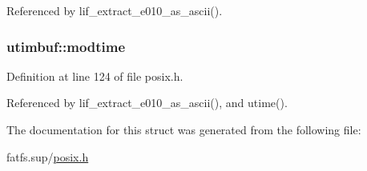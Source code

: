 Referenced by lif\+\_\+extract\+\_\+e010\+\_\+as\+\_\+ascii().

\subsubsection[{\texorpdfstring{modtime}{modtime}}]{ utimbuf\+::modtime}\hypertarget{structutimbuf_a7588ffe699a9eda52e94aa593bf7d6d8}{}\label{structutimbuf_a7588ffe699a9eda52e94aa593bf7d6d8}


Definition at line 124 of file posix.\+h.



Referenced by lif\+\_\+extract\+\_\+e010\+\_\+as\+\_\+ascii(), and utime().



The documentation for this struct was generated from the following file\+:\begin{DoxyCompactItemize}
\item 
fatfs.\+sup/\hyperlink{posix_8h}{posix.\+h}\end{DoxyCompactItemize}
